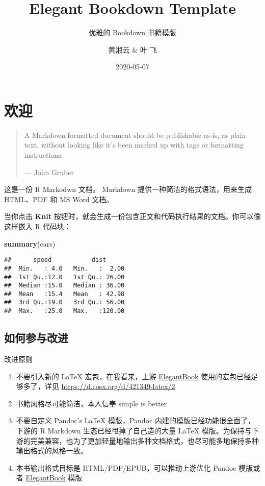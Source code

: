 \documentclass[
  lang=cn,
  11pt,
  scheme=chinese,
  chinesefont=nofont,
  bibstyle=apalike]{elegantbook}
\institute{A bookdown wrapper for ElegantBook}
\title{Elegant Bookdown Template}
\subtitle{优雅的 Bookdown 书籍模版}
\author{黄湘云 \& 叶 飞}
\date{2020-05-07}
\newenvironment{Shaded}{\begin{snugshade}}{\end{snugshade}}
\newcommand{\KeywordTok}[1]{\textcolor[rgb]{0.13,0.29,0.53}{\textbf{#1}}}
\newcommand{\NormalTok}[1]{#1}
\begin{document}
\maketitle

{
\hypersetup{linkcolor=Maroon}
\setcounter{tocdepth}{2}
\tableofcontents
}
\listoftables
\listoffigures
\mainmatter

\hypertarget{welcome}{%
\chapter{欢迎}\label{welcome}}

\begin{quote}
A Markdown-formatted document should be publishable as-is, as plain text, without looking like it's been marked up with tags or formatting instructions.

\hspace*{\fill} --- John Gruber
\end{quote}

这是一份 R Markodwn 文档。 Markdown 提供一种简洁的格式语法，用来生成 HTML、PDF 和 MS Word 文档。

当你点击 \textbf{Knit} 按钮时，就会生成一份包含正文和代码执行结果的文档。你可以像这样嵌入 R 代码块：

\begin{Shaded}
\begin{Highlighting}[]
\KeywordTok{summary}\NormalTok{(cars)}
\end{Highlighting}
\end{Shaded}

\begin{verbatim}
##      speed           dist       
##  Min.   : 4.0   Min.   :  2.00  
##  1st Qu.:12.0   1st Qu.: 26.00  
##  Median :15.0   Median : 36.00  
##  Mean   :15.4   Mean   : 42.98  
##  3rd Qu.:19.0   3rd Qu.: 56.00  
##  Max.   :25.0   Max.   :120.00
\end{verbatim}

\hypertarget{pr}{%
\section{如何参与改进}\label{pr}}

改进原则

\begin{enumerate}
\def\labelenumi{\arabic{enumi}.}

\item
  不要引入新的 LaTeX 宏包，在我看来，上游 \href{https://github.com/ElegantLaTeX/ElegantBook}{ElegantBook} 使用的宏包已经足够多了，详见 \url{https://d.cosx.org/d/421349-latex/2}
\item
  书籍风格尽可能简洁，本人信奉 simple is better
\item
  不要自定义 Pandoc's LaTeX 模版，Pandoc 内建的模版已经功能很全面了，下游的 R Markdown 生态已经甩掉了自己造的大量 LaTeX 模版。为保持与下游的完美兼容，也为了更加轻量地输出多种文档格式，也尽可能多地保持多种输出格式的风格一致。
\item
  本书输出格式目标是 HTML/PDF/EPUB，可以推动上游优化 Pandoc 模版或者 \href{https://github.com/ElegantLaTeX/ElegantBook}{ElegantBook} 模版
\end{enumerate}
\end{document}
